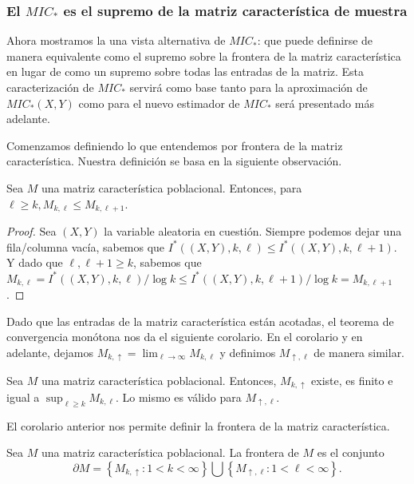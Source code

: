         \subsubsection[El MIC star es el supremo de la matriz caracteristica de muestra]{El $MIC_*$ es el supremo de la matriz caracter\'istica de muestra}
    
        Ahora mostramos la una vista alternativa de $MIC_*$: que puede definirse de manera equivalente como el supremo sobre la frontera de la matriz caracter\'istica en lugar de como un supremo sobre todas las entradas de la matriz. Esta caracterizaci\'on de $MIC_*$ servir\'a como base tanto para la aproximaci\'on de $MIC_*(X, Y)$ como para el nuevo estimador de $MIC_*$ ser\'a presentado m\'as adelante.
    
        Comenzamos definiendo lo que entendemos por frontera de la matriz caracter\'istica. Nuestra definici\'on se basa en la siguiente observaci\'on.
        \begin{prop}
            Sea $M$ una matriz caracter\'istica poblacional. Entonces, para $\ell \geq k, M_{k, \ell} \leq M_{k, \ell+1}$.
        \end{prop}
        \begin{proof}
            Sea $(X, Y)$ la variable aleatoria en cuesti\'on. Siempre podemos dejar una fila/columna vac\'ia, sabemos que $I^*((X, Y), k, \ell) \leq I^*((X, Y), k, \ell+1)$. Y dado que $\ell, \ell+1 \geq k$, sabemos que $M_{k, \ell}=I^*((X, Y), k, \ell) / \log k \leq I^*((X, Y), k, \ell+1) / \log k=M_{k, \ell+1}$.
        \end{proof}
    
        Dado que las entradas de la matriz caracter\'istica est\'an acotadas, el teorema de convergencia mon\'otona nos da el siguiente corolario. En el corolario y en adelante, dejamos $M_{k, \uparrow}=\lim _{\ell \rightarrow \infty} M_{k, \ell}$ y definimos $M_{\uparrow, \ell}$ de manera similar.

        \begin{cor}
            Sea $M$ una matriz caracter\'istica poblacional. Entonces, $M_{k, \uparrow}$ existe, es finito e igual a $\sup _{\ell \geq k} M_{k, \ell}$. Lo mismo es v\'alido para $M_{\uparrow, \ell}$. \label{cor:frontera}
        \end{cor}
    
        El corolario anterior nos permite definir la frontera de la matriz caracter\'istica.
    
        \begin{defn}
            Sea $M$ una matriz caracter\'istica poblacional. La frontera de $M$ es el conjunto
            $$
            \partial M=\left\{M_{k, \uparrow}: 1<k<\infty\right\} \bigcup\left\{M_{\uparrow, \ell}: 1<\ell<\infty\right\}.
            $$
        \end{defn}
        
